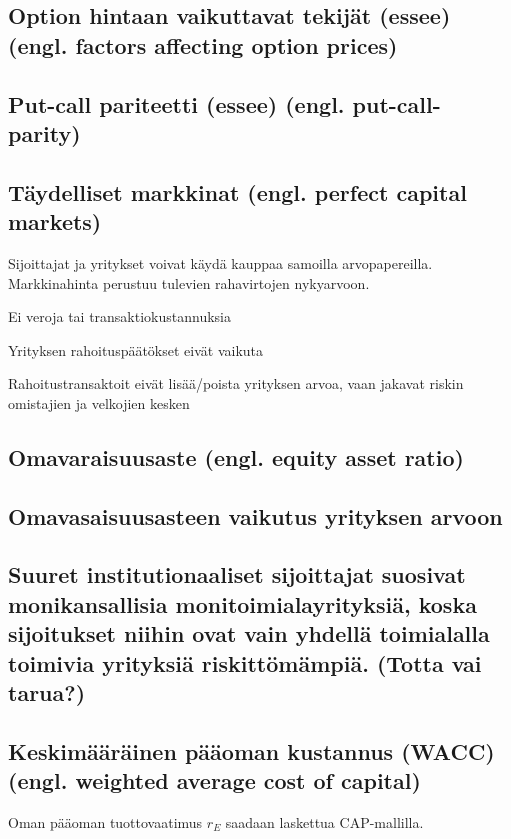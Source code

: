 \documentclass[a4paper]{article}
\begin{document}
\subsection{Option hintaan vaikuttavat tekijät (essee) (engl. factors affecting option prices)}

\subsection{Put-call pariteetti (essee) (engl. put-call-parity)}

\subsection{Täydelliset markkinat (engl. perfect capital markets)}

Sijoittajat ja yritykset voivat käydä kauppaa samoilla arvopapereilla. Markkinahinta perustuu tulevien rahavirtojen nykyarvoon.

Ei veroja tai transaktiokustannuksia

Yrityksen rahoituspäätökset eivät vaikuta

Rahoitustransaktoit eivät lisää/poista yrityksen arvoa, vaan jakavat riskin omistajien ja velkojien kesken

\subsection{Omavaraisuusaste (engl. equity asset ratio)}

\subsection{Omavasaisuusasteen vaikutus yrityksen arvoon}

\subsection{Suuret institutionaaliset sijoittajat suosivat monikansallisia monitoimialayrityksiä, koska sijoitukset niihin ovat vain yhdellä toimialalla toimivia yrityksiä riskittömämpiä. (Totta vai tarua?)}

\subsection{Keskimääräinen pääoman kustannus (WACC) (engl. weighted average cost of capital)}

Oman pääoman tuottovaatimus $r_E$ saadaan laskettua CAP-mallilla.
\end{document}
